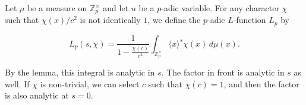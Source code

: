 Let $\mu$ be a measure on $\mathbb{Z}_p^{\times}$ and let $u$ be a $p$-adic variable. For any character $\chi$ such that $\chi(x)/c^2$ is not identically $1$, we define the $p$-adic $L$-function $L_p$ by

$$L_p(s, \chi) = \frac{1}{1 - \frac{\chi(c)}{c^2}} \int_{\mathbb{Z}_p^{\times}} \langle x \rangle^{s} \chi(x) \, d\mu(x).$$

By the lemma, this integral is analytic in $s$. The factor in front is analytic in $s$ as well. If $\chi$ is non-trivial, we can select $c$ such that $\chi(c) = 1$, and then the factor is also analytic at $s = 0$.
